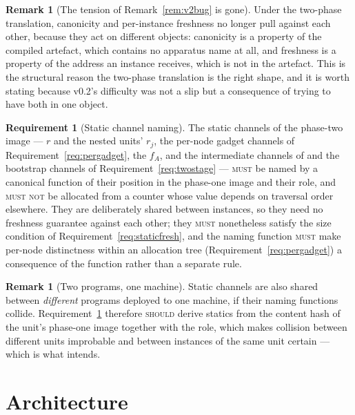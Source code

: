 \documentclass[11pt,a4paper]{article}
\newcommand{\MUST}{\textsc{must}}
\newcommand{\MUSTNOT}{\textsc{must not}}
\newcommand{\SHOULD}{\textsc{should}}
\theoremstyle{definition}
\newtheorem{requirement}[definition]{Requirement}
\newtheorem{remark}[definition]{Remark}
\theoremstyle{plain}
\begin{document}
\begin{remark}[The tension of Remark~\ref{rem:v2bug} is gone]
Under the two-phase translation, canonicity and per-instance freshness no
longer pull against each other, because they act on different objects:
canonicity is a property of the compiled artefact, which contains no apparatus
name at all, and freshness is a property of the address an instance receives,
which is not in the artefact. This is the structural reason the two-phase
translation is the right shape, and it is worth stating because v0.2's
difficulty was not a slip but a consequence of trying to have both in one
object.
\end{remark}

\begin{requirement}[Static channel naming]\label{req:statics}
The static channels of the phase-two image --- $r$ and the nested units'
$r_{j}$, the per-node gadget channels of Requirement~\ref{req:pergadget},
the $f_{A}$, and the intermediate channels of
and the bootstrap channels of Requirement~\ref{req:twostage} --- \MUST{} be
named by a canonical function of
their position in the phase-one image and their role, and \MUSTNOT{} be
allocated from a counter whose value depends on traversal order elsewhere.
They are deliberately shared between instances, so they need no freshness
guarantee against each other; they \MUST{} nonetheless satisfy the size
condition of Requirement~\ref{req:staticfresh}, and the naming function
\MUST{} make per-node distinctness within an allocation tree
(Requirement~\ref{req:pergadget}) a consequence of the function rather than a
separate rule.
\end{requirement}

\begin{remark}[Two programs, one machine]
Static channels are also shared between \emph{different} programs deployed to
one machine, if their naming functions collide. Requirement~\ref{req:statics}
therefore \SHOULD{} derive statics from the content hash of the unit's
phase-one image together with the role, which makes collision between
different units improbable and between instances of the same unit certain ---
which is what \cite[Rem.~6.10]{draft3} intends.
\end{remark}

\section{Architecture}\label{sec:arch}
\end{document}
